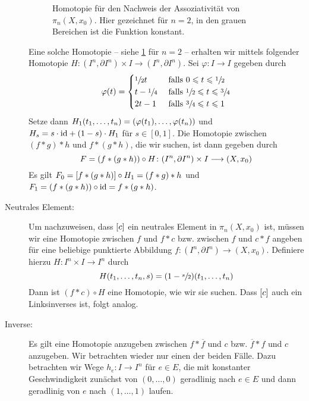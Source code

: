 \begin{beweis}
\begin{description}
\begin{figure}[p]
			\caption[Homotopie für den Nachweis der Assoziativität von $\pi_n(X,x_0)$]{Homotopie für den Nachweis der Assoziativität von $\pi_n(X,x_0)$. Hier gezeichnet für $n=2$, in den grauen Bereichen ist die Funktion konstant.}\label{fig:assoz_pi_n}
		\end{figure}
		Eine solche Homotopie -- siehe \cref{fig:assoz_pi_n} für $n=2$ -- erhalten wir mittels folgender Homotopie $H \colon (I^n,\partial I^n) \times I \to (I^n,\partial I^n)$.
		Sei $\varphi \colon I \to I$ gegeben durch
		\[
			\varphi(t) = \begin{cases}
				\sfrac{1}{2}t &\text{ falls } 0 \le t \le \sfrac{1}{2} \\
				t-  \sfrac{1}{4}  &\text{ falls } \sfrac{1}{2} \le t \le \sfrac{3}{4} \\
				2t - 1  &\text{ falls } \sfrac{3}{4} \le t \le 1
			\end{cases}
		\]
		Setze dann $H_1(t_1, \ldots ,t_n) = \enbrace*{\varphi(t_1), \ldots , \varphi(t_n)}$ und $H_s = s \cdot {\id} + (1-s) \cdot H_1$ für $s \in [0,1]$.
		Die Homotopie zwischen $(f * g ) * h$ und $f * (g * h)$, die wir suchen, ist dann gegeben durch
		\[
			F = \enbrace*{f * (g * h)} \circ H \colon (I^n,\partial I^n) \times I \longrightarrow (X,x_0)
		\]
		Es gilt $F_0 = \benbrace*{f * (g * h)} \circ H_1 = (f * g) * h$ und $F_1 = \enbrace*{f * (g * h)} \circ {\id} = f * (g * h)$.
		\item[Neutrales Element:] Um nachzuweisen, dass $\benbrace*{c}$ ein neutrales Element in $\pi_n(X,x_0)$ ist, müssen wir eine Homotopie zwischen $f$ und $f * c$ bzw. zwischen $f$ und $c * f$ angeben für eine beliebige punktierte Abbildung $f \colon (I^n,\partial I^n) \to (X,x_0)$.
		Definiere hierzu $H \colon I^n \times I \to I^n$ durch
		\[
			H(t_1, \ldots ,t_n,s) = (1- \sfrac{s}{2}) (t_1, \ldots ,t_n)
		\]
		Dann ist $(f * c) \circ H$ eine Homotopie, wie wir sie suchen.
		Dass $\benbrace*{c}$ auch ein Linksinverses ist, folgt analog.
		\item[Inverse:] Es gilt eine Homotopie anzugeben zwischen $f * \overline{f}$ und $c$ bzw. $\overline{f} * f$ und $c$ anzugeben.
		Wir betrachten wieder nur einen der beiden Fälle.
		Dazu betrachten wir Wege $h_e \colon I \to I^n$ für $e \in E$, die mit konstanter Geschwindigkeit zunächst von $(0,\ldots ,0)$ geradlinig nach $e \in E$ und dann geradlinig von $e$ nach $(1,\ldots ,1)$ laufen.
		

\end{description}
\end{beweis}
